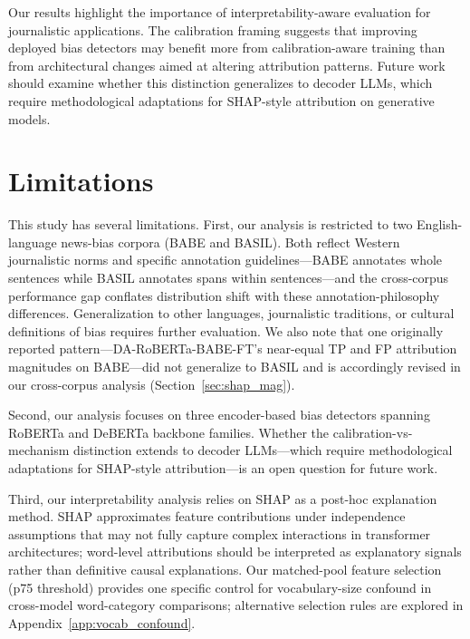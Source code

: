 \documentclass[11pt]{article}
\begin{document}
Our results highlight the importance of interpretability-aware 
evaluation for journalistic applications. The calibration framing 
suggests that improving deployed bias detectors may benefit more 
from calibration-aware training than from architectural changes 
aimed at altering attribution patterns. Future work should examine 
whether this distinction generalizes to decoder LLMs, which require 
methodological adaptations for SHAP-style attribution on generative 
models.


\section{Limitations}

This study has several limitations. First, our analysis is restricted 
to two English-language news-bias corpora (BABE and BASIL). Both 
reflect Western journalistic norms and specific annotation 
guidelines---BABE annotates whole sentences while BASIL annotates 
spans within sentences---and the cross-corpus performance gap 
conflates distribution shift with these annotation-philosophy 
differences. Generalization to other languages, journalistic 
traditions, or cultural definitions of bias requires further 
evaluation. We also note that one originally reported pattern---DA-RoBERTa-BABE-FT's near-equal TP and FP attribution magnitudes on BABE---did not generalize to BASIL and is accordingly revised in our cross-corpus analysis (Section~\ref{sec:shap_mag}).

Second, our analysis focuses on three encoder-based bias detectors 
spanning RoBERTa and DeBERTa backbone families. Whether the 
calibration-vs-mechanism distinction extends to decoder LLMs---which 
require methodological adaptations for SHAP-style attribution---is 
an open question for future work.


Third, our interpretability analysis relies on SHAP as a post-hoc 
explanation method. SHAP approximates feature contributions under 
independence assumptions that may not fully capture complex 
interactions in transformer architectures; word-level attributions 
should be interpreted as explanatory signals rather than definitive 
causal explanations. Our matched-pool feature selection (p75 
threshold) provides one specific control for vocabulary-size confound 
in cross-model word-category comparisons; alternative selection 
rules are explored in Appendix~\ref{app:vocab_confound}.
\end{document}
